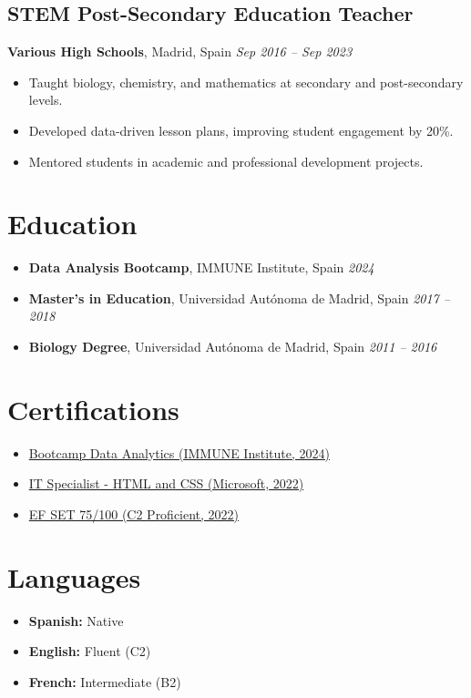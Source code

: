 \documentclass[11pt,a4paper]{article}
\begin{document}
\subsection*{STEM Post-Secondary Education Teacher}
\textbf{Various High Schools}, Madrid, Spain \hfill \textit{Sep 2016 – Sep 2023}  
\begin{itemize}[label=\textbullet, leftmargin=0.5cm]
    \item Taught biology, chemistry, and mathematics at secondary and post-secondary levels.
    \item Developed data-driven lesson plans, improving student engagement by 20\%.
    \item Mentored students in academic and professional development projects.
\end{itemize}

\vspace{1em}

\section*{Education}
\begin{itemize}[leftmargin=0.5cm]
    \item \textbf{Data Analysis Bootcamp}, IMMUNE Institute, Spain \hfill \textit{2024}
    \item \textbf{Master's in Education}, Universidad Autónoma de Madrid, Spain \hfill \textit{2017 – 2018}
    \item \textbf{Biology Degree}, Universidad Autónoma de Madrid, Spain \hfill \textit{2011 – 2016}
\end{itemize}

\vspace{1em}

\section*{Certifications}
\begin{itemize}[leftmargin=0.5cm]
    \item \href{https://www.credential.net/ad14325c-15f7-4a4a-8c27-0969c1ead58c#acc.b7DS18T2}{Bootcamp Data Analytics (IMMUNE Institute, 2024)}
    \item \href{https://www.credly.com/badges/b44395d5-2341-454c-bb2f-4e815e1cf16a/public_url}{IT Specialist - HTML and CSS (Microsoft, 2022)}
    \item \href{https://cert.efset.org/wDUAG4}{EF SET 75/100 (C2 Proficient, 2022)}
\end{itemize}

\vspace{1em}

\section*{Languages}
\begin{itemize}[leftmargin=0.5cm]
    \item \textbf{Spanish:} Native
    \item \textbf{English:} Fluent (C2)
    \item \textbf{French:} Intermediate (B2)
\end{itemize}
\end{document}

